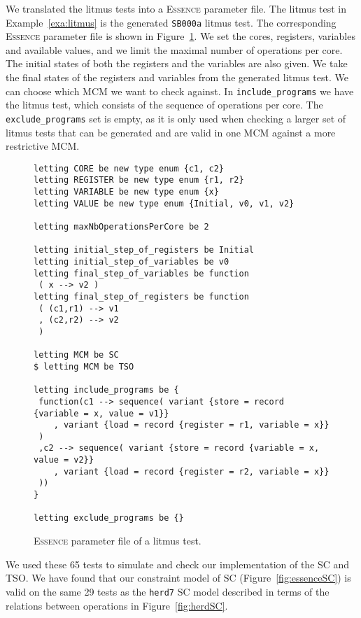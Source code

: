 \documentclass[runningheads]{llncs}
\newcommand{\essence}[0]{\textsc{Essence}}
\begin{document}
We translated the litmus tests into a \essence{} parameter file.
The litmus test in Example~\ref{exa:litmus} is the generated {\tt{SB000a}} litmus test.
The corresponding \essence{} parameter file is shown in Figure~\ref{fig:essenceparam}.
We set the cores, registers, variables and available values, and we limit the maximal number of operations per core.
The initial states of both the registers and the variables are also given.
We take the final states of the registers and variables from the generated litmus test.
We can choose which MCM we want to check against.
In {\tt{include\_programs}} we have the litmus test, which consists of the sequence of operations per core.
The {\tt{exclude\_programs}} set is empty, as it is only used when checking a larger set of litmus tests that can be generated and are valid in one MCM against a more restrictive MCM.

\begin{figure}
\begin{lstlisting}
letting CORE be new type enum {c1, c2}
letting REGISTER be new type enum {r1, r2}
letting VARIABLE be new type enum {x}
letting VALUE be new type enum {Initial, v0, v1, v2}

letting maxNbOperationsPerCore be 2

letting initial_step_of_registers be Initial
letting initial_step_of_variables be v0
letting final_step_of_variables be function
 ( x --> v2 )
letting final_step_of_registers be function
 ( (c1,r1) --> v1
 , (c2,r2) --> v2
 )

letting MCM be SC
$ letting MCM be TSO

letting include_programs be {
 function(c1 --> sequence( variant {store = record {variable = x, value = v1}}
    , variant {load = record {register = r1, variable = x}}
 )
 ,c2 --> sequence( variant {store = record {variable = x, value = v2}}
    , variant {load = record {register = r2, variable = x}}
 ))
}

letting exclude_programs be {}
\end{lstlisting}
\caption{\essence{} parameter file of a litmus test.\label{fig:essenceparam}}
\end{figure}


We used these 65 tests to simulate and check our implementation of the SC and TSO.
We have found that our constraint model of SC (Figure~\ref{fig:essenceSC}) is valid on the same 29 tests as the {\tt{herd7}} SC model described in terms of the relations between operations in Figure~\ref{fig:herdSC}.
\end{document}
